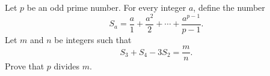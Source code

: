 Let $p$ be an odd prime number. For every integer $a$, define the number
\[
S_a = \frac{a}{1} + \frac{a^2}{2} + \cdots + \frac{a^{p-1}}{p-1}.
\]
Let $m$ and $n$ be integers such that
\[
S_3 + S_4 - 3S_2 = \frac{m}{n}.
\]
Prove that $p$ divides $m$.
